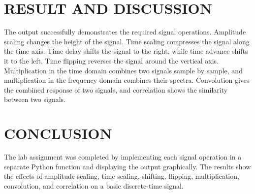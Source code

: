 \documentclass[12pt,a4paper]{article}
\begin{document}
\section*{RESULT AND DISCUSSION}

The output successfully demonstrates the required signal operations. Amplitude scaling changes the height of the signal. Time scaling compresses the signal along the time axis. Time delay shifts the signal to the right, while time advance shifts it to the left. Time flipping reverses the signal around the vertical axis. Multiplication in the time domain combines two signals sample by sample, and multiplication in the frequency domain combines their spectra. Convolution gives the combined response of two signals, and correlation shows the similarity between two signals.

\section*{CONCLUSION}

The lab assignment was completed by implementing each signal operation in a separate Python function and displaying the output graphically. The results show the effects of amplitude scaling, time scaling, shifting, flipping, multiplication, convolution, and correlation on a basic discrete-time signal.
\end{document}
